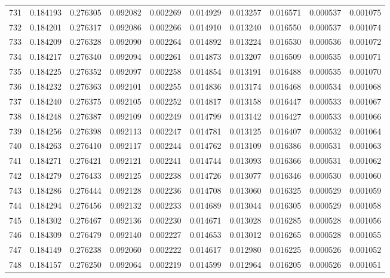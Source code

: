 \begin{tabular}{lrrrrrrrrr}
731 & 0.184193 & 0.276305 & 0.092082 & 0.002269 & 0.014929 & 0.013257 & 0.016571 & 0.000537 & 0.001075 \\
732 & 0.184201 & 0.276317 & 0.092086 & 0.002266 & 0.014910 & 0.013240 & 0.016550 & 0.000537 & 0.001074 \\
733 & 0.184209 & 0.276328 & 0.092090 & 0.002264 & 0.014892 & 0.013224 & 0.016530 & 0.000536 & 0.001072 \\
734 & 0.184217 & 0.276340 & 0.092094 & 0.002261 & 0.014873 & 0.013207 & 0.016509 & 0.000535 & 0.001071 \\
735 & 0.184225 & 0.276352 & 0.092097 & 0.002258 & 0.014854 & 0.013191 & 0.016488 & 0.000535 & 0.001070 \\
736 & 0.184232 & 0.276363 & 0.092101 & 0.002255 & 0.014836 & 0.013174 & 0.016468 & 0.000534 & 0.001068 \\
737 & 0.184240 & 0.276375 & 0.092105 & 0.002252 & 0.014817 & 0.013158 & 0.016447 & 0.000533 & 0.001067 \\
738 & 0.184248 & 0.276387 & 0.092109 & 0.002249 & 0.014799 & 0.013142 & 0.016427 & 0.000533 & 0.001066 \\
739 & 0.184256 & 0.276398 & 0.092113 & 0.002247 & 0.014781 & 0.013125 & 0.016407 & 0.000532 & 0.001064 \\
740 & 0.184263 & 0.276410 & 0.092117 & 0.002244 & 0.014762 & 0.013109 & 0.016386 & 0.000531 & 0.001063 \\
741 & 0.184271 & 0.276421 & 0.092121 & 0.002241 & 0.014744 & 0.013093 & 0.016366 & 0.000531 & 0.001062 \\
742 & 0.184279 & 0.276433 & 0.092125 & 0.002238 & 0.014726 & 0.013077 & 0.016346 & 0.000530 & 0.001060 \\
743 & 0.184286 & 0.276444 & 0.092128 & 0.002236 & 0.014708 & 0.013060 & 0.016325 & 0.000529 & 0.001059 \\
744 & 0.184294 & 0.276456 & 0.092132 & 0.002233 & 0.014689 & 0.013044 & 0.016305 & 0.000529 & 0.001058 \\
745 & 0.184302 & 0.276467 & 0.092136 & 0.002230 & 0.014671 & 0.013028 & 0.016285 & 0.000528 & 0.001056 \\
746 & 0.184309 & 0.276479 & 0.092140 & 0.002227 & 0.014653 & 0.013012 & 0.016265 & 0.000528 & 0.001055 \\
747 & 0.184149 & 0.276238 & 0.092060 & 0.002222 & 0.014617 & 0.012980 & 0.016225 & 0.000526 & 0.001052 \\
748 & 0.184157 & 0.276250 & 0.092064 & 0.002219 & 0.014599 & 0.012964 & 0.016205 & 0.000526 & 0.001051 \\

\end{tabular}
